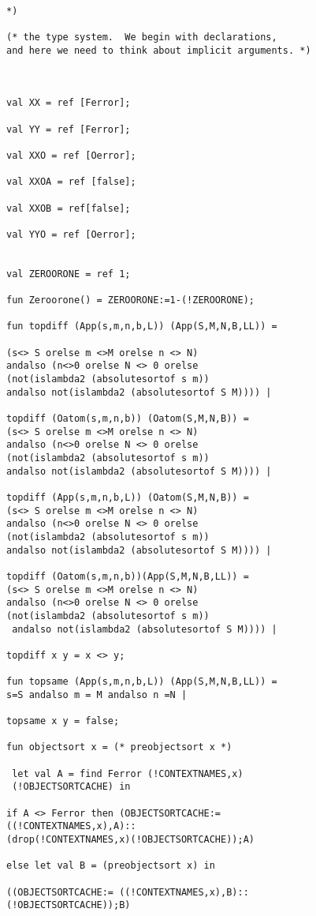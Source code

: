 \documentclass[12pt]{article}
\begin{document}
\begin{verbatim}

*)

(* the type system.  We begin with declarations, 
and here we need to think about implicit arguments. *)



val XX = ref [Ferror];

val YY = ref [Ferror];

val XXO = ref [Oerror];

val XXOA = ref [false];

val XXOB = ref[false];

val YYO = ref [Oerror];


val ZEROORONE = ref 1;

fun Zeroorone() = ZEROORONE:=1-(!ZEROORONE);

fun topdiff (App(s,m,n,b,L)) (App(S,M,N,B,LL)) =

(s<> S orelse m <>M orelse n <> N) 
andalso (n<>0 orelse N <> 0 orelse
(not(islambda2 (absolutesortof s m)) 
andalso not(islambda2 (absolutesortof S M)))) |

topdiff (Oatom(s,m,n,b)) (Oatom(S,M,N,B)) =
(s<> S orelse m <>M orelse n <> N) 
andalso (n<>0 orelse N <> 0 orelse
(not(islambda2 (absolutesortof s m)) 
andalso not(islambda2 (absolutesortof S M)))) |

topdiff (App(s,m,n,b,L)) (Oatom(S,M,N,B)) =
(s<> S orelse m <>M orelse n <> N) 
andalso (n<>0 orelse N <> 0 orelse
(not(islambda2 (absolutesortof s m)) 
andalso not(islambda2 (absolutesortof S M)))) |

topdiff (Oatom(s,m,n,b))(App(S,M,N,B,LL)) =
(s<> S orelse m <>M orelse n <> N) 
andalso (n<>0 orelse N <> 0 orelse
(not(islambda2 (absolutesortof s m))
 andalso not(islambda2 (absolutesortof S M)))) |

topdiff x y = x <> y;

fun topsame (App(s,m,n,b,L)) (App(S,M,N,B,LL)) =
s=S andalso m = M andalso n =N |

topsame x y = false;

fun objectsort x = (* preobjectsort x *)

 let val A = find Ferror (!CONTEXTNAMES,x)
 (!OBJECTSORTCACHE) in

if A <> Ferror then (OBJECTSORTCACHE:= 
((!CONTEXTNAMES,x),A)::
(drop(!CONTEXTNAMES,x)(!OBJECTSORTCACHE));A)

else let val B = (preobjectsort x) in

((OBJECTSORTCACHE:= ((!CONTEXTNAMES,x),B)::
(!OBJECTSORTCACHE));B)


\end{verbatim}
\end{document}
